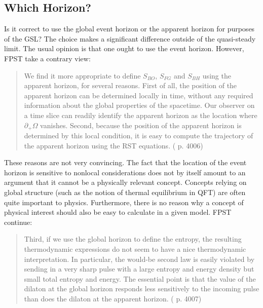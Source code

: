 \documentclass[12pt]{article}
\begin{document}
\subsection{Which Horizon?}\label{horizon}

Is it correct to use the global event horizon or the apparent horizon for purposes of the GSL?  The choice makes a significant difference outside of the quasi-steady limit.  The usual opinion is that one ought to use the event horizon.  However, FPST take a contrary view:
\begin{quote}\small
We find it more appropriate to define $S_{BO}$, $S_{FG}$ and $S_{BH}$ using the apparent horizon, for several reasons.  First of all, the position of the apparent horizon can be determined locally in time, without any required information about the global properties of the spacetime.  Our observer on a time slice can readily identify the apparent horizon as the location where $\partial_{+} \Omega$ vanishes.  Second, because the position of the apparent horizon is determined by this local condition, it is easy to compute the trajectory of the apparent horizon using the RST equations.  (\cite{fiola94} p. 4006)
\end{quote}
These reasons are not very convincing.  The fact that the location of the event horizon is sensitive to nonlocal considerations does not by itself amount to an argument that it cannot be a physically relevant concept.  Concepts relying on global structure (such as the notion of thermal equilibrium in QFT) are often quite important to physics.  Furthermore, there is no reason why a concept of physical interest should also be easy to calculate in a given model.  FPST continue:
\begin{quote}\small
Third, if we use the global horizon to define the entropy, the resulting thermodynamic expressions do not seem to have a nice thermodynamic interpretation.  In particular, the would-be second law is easily violated by sending in a very sharp pulse with a large entropy and energy density but small total entropy and energy.  The essential point is that the value of the dilaton at the global horizon responds less sensitively to the incoming pulse than does the dilaton at the apparent horizon.  (\cite{fiola94} p. 4007)
\end{quote}
\end{document}
